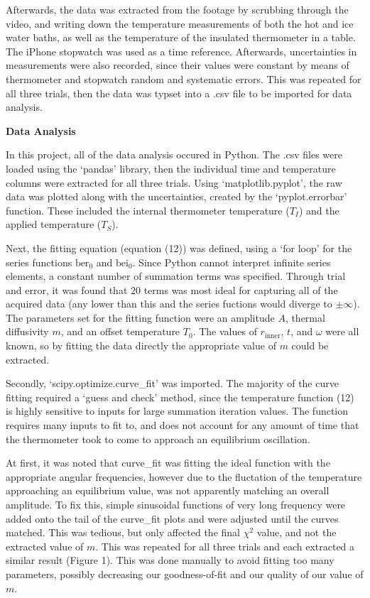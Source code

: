 \documentclass[11pt]{article}
\begin{document}
\begin{multicols}{2}
    Afterwards, the data was extracted from the footage by scrubbing through the video, and writing down the temperature measurements of both the hot and ice water baths, as well as the temperature of the insulated thermometer in a table. The iPhone stopwatch was used as a time reference. Afterwards, uncertainties in measurements were also recorded, since their values were constant by means of thermometer and stopwatch random and systematic errors. This was repeated for all three trials, then the data was typset into a .csv file to be imported for data analysis.



    \vspace{10pt}

     \selectfont \textbf{Data Analysis}
    
     \selectfont In this project, all of the data analysis occured in Python. The .csv files were loaded using the `pandas' library, then the individual time and temperature columns were extracted for all three trials. Using `matplotlib.pyplot', the raw data was plotted along with the uncertainties, created by the `pyplot.errorbar' function. These included the internal thermometer temperature ($T_I$) and the applied temperature ($T_S$). 

    Next, the fitting equation (equation (12)) was defined, using a `for loop' for the series functions $\text{ber}_0$ and $\text{bei}_0$. Since Python cannot interpret infinite series elements, a constant number of summation terms was specified. Through trial and error, it was found that $20$ terms was most ideal for capturing all of the acquired data (any lower than this and the series fuctions would diverge to $\pm\infty$). The parameters set for the fitting function were an amplitude $A$, thermal diffusivity $m$, and an offset temperature $T_0$. The values of $r_{\text{inner}}$, $t$, and $\omega$ were all known, so by fitting the data directly the appropriate value of $m$ could be extracted.   

    Secondly, `scipy.optimize.curve\_fit' was imported. The majority of the curve fitting required a `guess and check' method, since the temperature function (12) is highly sensitive to inputs for large summation iteration values. The function requires many inputs to fit to, and does not account for any amount of time that the thermometer took to come to approach an equilibrium oscillation. 

    At first, it was noted that curve\_fit was fitting the ideal function with the appropriate angular frequencies, however due to the fluctation of the temperature approaching an equilibrium value, was not apparently matching an overall amplitude. To fix this, simple sinusoidal functions of very long frequency were added onto the tail of the curve\_fit plots and were adjusted until the curves matched. This was tedious, but only affected the final $\chi^2$ value, and not the extracted value of $m$. This was repeated for all three trials and each extracted a similar result (Figure 1). This was done manually to avoid fitting too many parameters, possibly decreasing our goodness-of-fit and our quality of our value of $m$. 


\end{multicols}
\end{document}
